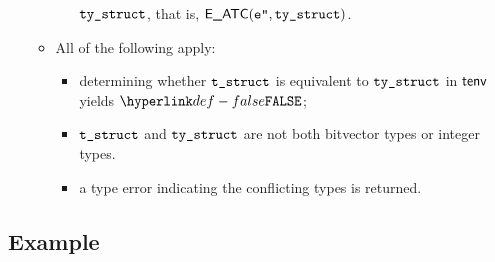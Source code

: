 \documentclass{book}
\begin{document}
\begin{itemize}
\begin{itemize}
\begin{itemize}
      $\texttt{ty\_struct}$, that is, $\textsf{E\_ATC}(\texttt{e''}, \texttt{ty\_struct})$.
    \end{itemize}
  \item All of the following apply:
    \begin{itemize}
    \item determining whether $\texttt{t\_struct}$ is equivalent to $\texttt{ty\_struct}$ in $\textsf{tenv}$ \\ yields $\False$;
    \item $\texttt{t\_struct}$ and $\texttt{ty\_struct}$ are not both bitvector types or integer types.
    \item a type error indicating the conflicting types is returned.
    \end{itemize}
  \end{itemize}
\end{itemize}

\subsection{Example}

\end{document}
